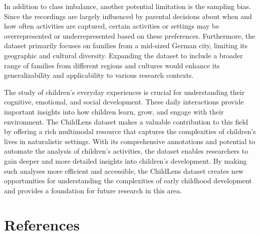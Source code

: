 \documentclass[
  man,floatsintext]{apa6}
\begin{document}
In addition to class imbalance, another potential limitation is the sampling bias. Since the recordings are largely influenced by parental decisions about when and how often activities are captured, certain activities or settings may be overrepresented or underrepresented based on these preferences. Furthermore, the dataset primarily focuses on families from a mid-sized German city, limiting its geographic and cultural diversity. Expanding the dataset to include a broader range of families from different regions and cultures would enhance its generalizability and applicability to various research contexts.

The study of children's everyday experiences is crucial for understanding their cognitive, emotional, and social development. These daily interactions provide important insights into how children learn, grow, and engage with their environment. The ChildLens dataset makes a valuable contribution to this field by offering a rich multimodal resource that captures the complexities of children's lives in naturalistic settings. With its comprehensive annotations and potential to automate the analysis of children's activities, the dataset enables researchers to gain deeper and more detailed insights into children's development. By making such analyses more efficient and accessible, the ChildLens dataset creates new opportunities for understanding the complexities of early childhood development and provides a foundation for future research in this area.

\newpage

\section{References}\label{references}

\begingroup
\setlength{\parindent}{-0.5in}
\setlength{\leftskip}{0.5in}
\end{document}
